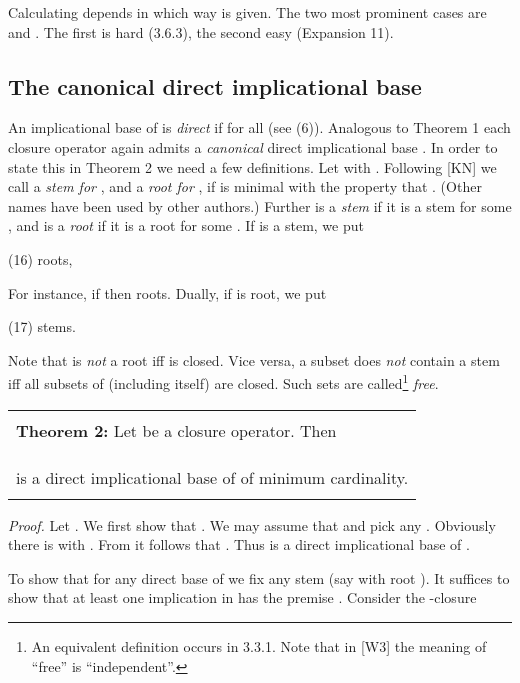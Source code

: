 \documentclass[11pt]{article}
\begin{document}
Calculating  depends in which way  is given. The two most prominent cases are  and .
The first is hard (3.6.3), the second easy (Expansion 11).

\subsection{The canonical direct implicational base}

An implicational base  of  is {\it direct} if  for all  (see (6)).
Analogous to Theorem 1 each closure operator again admits a {\it canonical} direct implicational base . In order to state this in Theorem 2 we need a few definitions.
Let  with . Following [KN] we call  a {\it stem for} , and  a {\it root for} , if  is minimal with the property that . (Other names have been used by other authors.) Further  is a {\it stem} if it is a stem for some , and  is a {\it root} if it is a root for some . If  is a stem, we put

(16) \quad roots,

For instance, if  then roots. Dually, if  is root, we put

(17) \quad stems.

Note that  is {\it not} a root iff  is closed. Vice versa, a subset  does {\it not} contain a stem iff all subsets of  (including  itself) are closed. Such sets  are called\footnote{An equivalent definition occurs in 3.3.1. Note that in [W3] the meaning of ``free''  is ``independent''.} {\it free}.

\begin{tabular}{|l|} \hline \\
{\bf Theorem 2:} Let  be a closure operator. Then\\
\\
\hspace*{3cm} \\
\\
is a direct implicational base of  of minimum cardinality.\\ \\ \hline \end{tabular}


{\it Proof.} Let . We first show that . We may assume that  and pick any . Obviously there is  with . From  it follows that . Thus  is a direct implicational base of .

To show that   for any direct base  of  we fix any stem  (say with root ).  It suffices to show that at least one implication in  has the premise . Consider the -closure
\end{document}
